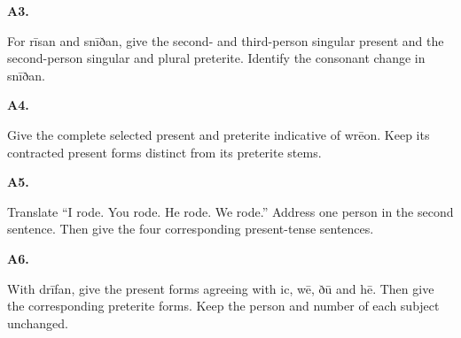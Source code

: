 \par\begin{minipage}{\linewidth}\raggedright
\textbf{A3.}

For rīsan and snīðan, give the second- and third-person singular present and the second-person singular and plural preterite. Identify the consonant change in snīðan.

\end{minipage}\par\addvspace{4pt}

\par\begin{minipage}{\linewidth}\raggedright
\textbf{A4.}

Give the complete selected present and preterite indicative of wrēon. Keep its contracted present forms distinct from its preterite stems.

\end{minipage}\par\addvspace{4pt}

\par\begin{minipage}{\linewidth}\raggedright
\textbf{A5.}

Translate “I rode. You rode. He rode. We rode.” Address one person in the second sentence. Then give the four corresponding present-tense sentences.

\end{minipage}\par\addvspace{4pt}

\par\begin{minipage}{\linewidth}\raggedright
\textbf{A6.}

With drīfan, give the present forms agreeing with ic, wē, ðū and hē. Then give the corresponding preterite forms. Keep the person and number of each subject unchanged.

\end{minipage}\par\addvspace{4pt}

